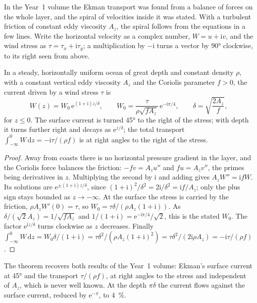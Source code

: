 In the Year~1 volume the Ekman transport was found from a balance of forces
on the whole layer, and the spiral of velocities inside it was stated. With
a turbulent friction of constant eddy viscosity $A_z$, the spiral follows
from the equations in a few lines. Write the horizontal velocity as a
complex number, $W = u + \mathrm iv$, and the wind stress as $\tau =
\tau_x + \mathrm i\tau_y$; a multiplication by $-\mathrm i$ turns a vector
by \ang{90} clockwise, to its right seen from above.

\begin{theorem}\label{thm:b3:ocean-dynamics:ekman}
In a steady, horizontally uniform ocean of great depth and constant density
$\rho$, with a constant vertical eddy viscosity $A_z$ and the Coriolis
parameter $f > 0$, the current driven by a wind stress $\tau$ is
\[
W(z) = W_0\,\mathrm e^{(1+\mathrm i)z/\delta},\qquad
W_0 = \frac{\tau}{\rho\sqrt{fA_z}}\,\mathrm e^{-\mathrm i\pi/4},\qquad
\delta = \sqrt{\frac{2A_z}{f}} ,
\]
for $z \le 0$. The surface current is turned \ang{45} to the right of the
stress; with depth it turns further right and decays as $\mathrm
e^{z/\delta}$; the total transport $\int_{-\infty}^0 W\,\mathrm dz =
-\mathrm i\tau/(\rho f)$ is at right angles to the right of the stress.
\end{theorem}

\begin{proof}
Away from coasts there is no horizontal pressure gradient in the layer,
and the Coriolis force balances the friction: $-fv = A_z u''$ and $fu =
A_z v''$, the primes being derivatives in $z$. Multiplying the second by
$\mathrm i$ and adding gives $A_zW'' = \mathrm ifW$. Its solutions are
$\mathrm e^{\pm(1+\mathrm i)z/\delta}$, since $(1+\mathrm i)^2/\delta^2 =
2\mathrm i/\delta^2 = \mathrm if/A_z$; only the plus sign stays bounded as
$z \to -\infty$. At the surface the stress is carried by the friction,
$\rho A_zW'(0) = \tau$, so $W_0 = \tau\delta/(\rho A_z(1+\mathrm i))$.
As $\delta/(\sqrt2 A_z) = 1/\sqrt{fA_z}$ and $1/(1+\mathrm i) = \mathrm
e^{-\mathrm i\pi/4}/\sqrt2$, this is the stated $W_0$. The factor
$\mathrm e^{\mathrm iz/\delta}$ turns clockwise as $z$ decreases. Finally
$\int_{-\infty}^0 W\,\mathrm dz = W_0\delta/(1+\mathrm i) =
\tau\delta^2/(\rho A_z(1+\mathrm i)^2) = \tau\delta^2/(2\mathrm i\rho A_z)
= -\mathrm i\tau/(\rho f)$.
\end{proof}

The theorem recovers both results of the Year~1 volume: Ekman's surface
current at \ang{45} and the transport $\tau/(\rho f)$, at right angles to
the stress and independent of $A_z$, which is never well known. At the
depth $\pi\delta$ the current flows against the surface current, reduced
by $\mathrm e^{-\pi}$, to \qty{4}{\percent}.

